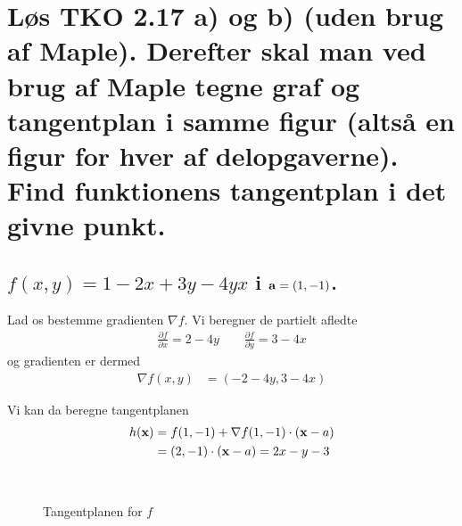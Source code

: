 \documentclass[11pt,a4paper]{article}
\newcommand{\colbreak}{\vfill{\ }\columnbreak}
\begin{document}
\section
{
    \mdseries
    Løs TKO 2.17 a) og b) (uden brug af Maple). Derefter skal man ved brug af
    Maple tegne graf og tangentplan i samme figur (altså en figur for hver af
    delopgaverne).
    \\
    Find funktionens tangentplan i det givne punkt.
}

\subsection
{
    \mdseries $f(x,y) = 1 - 2x + 3y - 4yx$ i ${\bf a} = (1,-1)$.
}
\begin{multicols}{2}
    Lad os bestemme gradienten $\nabla f$. Vi beregner de partielt afledte
    \begin{align}
        \frac{\partial f}{\partial x} = 2 - 4y
        \qquad
        \frac{\partial f}{\partial y} = 3 - 4x
    \end{align}
    og gradienten er dermed
    \begin{align}
        \nabla f(x,y) &= (-2 - 4y, 3 - 4x)
    \end{align}

    Vi kan da beregne tangentplanen
    \begin{align}
        h({\bf x}) &= f(1,-1) + \nabla f(1,-1) \cdot ({\bf x} - a) \\
                   &= (2, -1) \cdot ({\bf x} - a)
                    = 2x - y - 3
    \end{align}

    \colbreak

    \begin{figure}[H]
        \centering
        \caption{Tangentplanen for $f$}
        \label{fig:7-2a}
    \end{figure}

\end{multicols}

\end{document}
